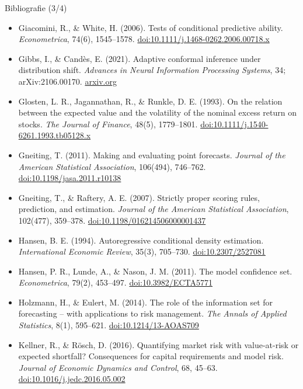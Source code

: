 \begin{frame}{Bibliografie (3/4)}
\itemsize{\tiny}
\begin{itemize}
    \item Giacomini, R., \& White, H. (2006). Tests of conditional predictive ability. \textit{Econometrica}, 74(6), 1545--1578. \href{https://doi.org/10.1111/j.1468-0262.2006.00718.x}{doi:10.1111/j.1468-0262.2006.00718.x}
    \item Gibbs, I., \& Candès, E. (2021). Adaptive conformal inference under distribution shift. \textit{Advances in Neural Information Processing Systems}, 34; arXiv:2106.00170. \href{https://arxiv.org/abs/2106.00170}{arxiv.org}
    \item Glosten, L. R., Jagannathan, R., \& Runkle, D. E. (1993). On the relation between the expected value and the volatility of the nominal excess return on stocks. \textit{The Journal of Finance}, 48(5), 1779--1801. \href{https://doi.org/10.1111/j.1540-6261.1993.tb05128.x}{doi:10.1111/j.1540-6261.1993.tb05128.x}
    \item Gneiting, T. (2011). Making and evaluating point forecasts. \textit{Journal of the American Statistical Association}, 106(494), 746--762. \href{https://doi.org/10.1198/jasa.2011.r10138}{doi:10.1198/jasa.2011.r10138}
    \item Gneiting, T., \& Raftery, A. E. (2007). Strictly proper scoring rules, prediction, and estimation. \textit{Journal of the American Statistical Association}, 102(477), 359--378. \href{https://doi.org/10.1198/016214506000001437}{doi:10.1198/016214506000001437}
    \item Hansen, B. E. (1994). Autoregressive conditional density estimation. \textit{International Economic Review}, 35(3), 705--730. \href{https://doi.org/10.2307/2527081}{doi:10.2307/2527081}
    \item Hansen, P. R., Lunde, A., \& Nason, J. M. (2011). The model confidence set. \textit{Econometrica}, 79(2), 453--497. \href{https://doi.org/10.3982/ECTA5771}{doi:10.3982/ECTA5771}
    \item Holzmann, H., \& Eulert, M. (2014). The role of the information set for forecasting -- with applications to risk management. \textit{The Annals of Applied Statistics}, 8(1), 595--621. \href{https://doi.org/10.1214/13-AOAS709}{doi:10.1214/13-AOAS709}
    \item Kellner, R., \& Rösch, D. (2016). Quantifying market risk with value-at-risk or expected shortfall? Consequences for capital requirements and model risk. \textit{Journal of Economic Dynamics and Control}, 68, 45--63. \href{https://doi.org/10.1016/j.jedc.2016.05.002}{doi:10.1016/j.jedc.2016.05.002}

\end{itemize}
\end{frame}
